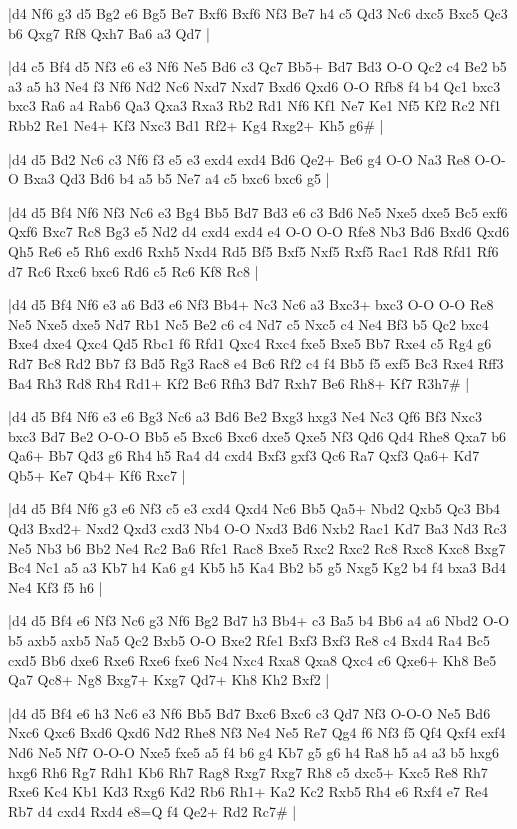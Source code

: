 \whitename{}
\blackname{}
\makegametitle
|d4 Nf6 g3 d5 Bg2 e6 Bg5 Be7 Bxf6 Bxf6 Nf3 Be7 h4 c5 Qd3 Nc6 dxc5 Bxc5 Qc3 b6 Qxg7 Rf8 Qxh7 Ba6 a3 Qd7  |

\whitename{}
\blackname{}
\makegametitle
|d4 c5 Bf4 d5 Nf3 e6 e3 Nf6 Ne5 Bd6 c3 Qc7 Bb5+ Bd7 Bd3 O-O Qc2 c4 Be2 b5 a3 a5 h3 Ne4 f3 Nf6 Nd2 Nc6 Nxd7 Nxd7 Bxd6 Qxd6 O-O Rfb8 f4 b4 Qc1 bxc3 bxc3 Ra6 a4 Rab6 Qa3 Qxa3 Rxa3 Rb2 Rd1 Nf6 Kf1 Ne7 Ke1 Nf5 Kf2 Rc2 Nf1 Rbb2 Re1 Ne4+ Kf3 Nxc3 Bd1 Rf2+ Kg4 Rxg2+ Kh5 g6\#  |

\whitename{}
\blackname{}
\makegametitle
|d4 d5 Bd2 Nc6 c3 Nf6 f3 e5 e3 exd4 exd4 Bd6 Qe2+ Be6 g4 O-O Na3 Re8 O-O-O Bxa3 Qd3 Bd6 b4 a5 b5 Ne7 a4 c5 bxc6 bxc6 g5  |

\whitename{}
\blackname{}
\makegametitle
|d4 d5 Bf4 Nf6 Nf3 Nc6 e3 Bg4 Bb5 Bd7 Bd3 e6 c3 Bd6 Ne5 Nxe5 dxe5 Bc5 exf6 Qxf6 Bxc7 Rc8 Bg3 e5 Nd2 d4 cxd4 exd4 e4 O-O O-O Rfe8 Nb3 Bd6 Bxd6 Qxd6 Qh5 Re6 e5 Rh6 exd6 Rxh5 Nxd4 Rd5 Bf5 Bxf5 Nxf5 Rxf5 Rac1 Rd8 Rfd1 Rf6 d7 Rc6 Rxc6 bxc6 Rd6 c5 Rc6 Kf8 Rc8  |

\whitename{}
\blackname{}
\makegametitle
|d4 d5 Bf4 Nf6 e3 a6 Bd3 e6 Nf3 Bb4+ Nc3 Nc6 a3 Bxc3+ bxc3 O-O O-O Re8 Ne5 Nxe5 dxe5 Nd7 Rb1 Nc5 Be2 c6 c4 Nd7 c5 Nxc5 c4 Ne4 Bf3 b5 Qc2 bxc4 Bxe4 dxe4 Qxc4 Qd5 Rbc1 f6 Rfd1 Qxc4 Rxc4 fxe5 Bxe5 Bb7 Rxe4 c5 Rg4 g6 Rd7 Bc8 Rd2 Bb7 f3 Bd5 Rg3 Rac8 e4 Bc6 Rf2 c4 f4 Bb5 f5 exf5 Bc3 Rxe4 Rff3 Ba4 Rh3 Rd8 Rh4 Rd1+ Kf2 Bc6 Rfh3 Bd7 Rxh7 Be6 Rh8+ Kf7 R3h7\#  |

\whitename{}
\blackname{}
\makegametitle
|d4 d5 Bf4 Nf6 e3 e6 Bg3 Nc6 a3 Bd6 Be2 Bxg3 hxg3 Ne4 Nc3 Qf6 Bf3 Nxc3 bxc3 Bd7 Be2 O-O-O Bb5 e5 Bxc6 Bxc6 dxe5 Qxe5 Nf3 Qd6 Qd4 Rhe8 Qxa7 b6 Qa6+ Bb7 Qd3 g6 Rh4 h5 Ra4 d4 cxd4 Bxf3 gxf3 Qc6 Ra7 Qxf3 Qa6+ Kd7 Qb5+ Ke7 Qb4+ Kf6 Rxc7  |

\whitename{}
\blackname{}
\makegametitle
|d4 d5 Bf4 Nf6 g3 e6 Nf3 c5 e3 cxd4 Qxd4 Nc6 Bb5 Qa5+ Nbd2 Qxb5 Qc3 Bb4 Qd3 Bxd2+ Nxd2 Qxd3 cxd3 Nb4 O-O Nxd3 Bd6 Nxb2 Rac1 Kd7 Ba3 Nd3 Rc3 Ne5 Nb3 b6 Bb2 Ne4 Rc2 Ba6 Rfc1 Rac8 Bxe5 Rxc2 Rxc2 Rc8 Rxc8 Kxc8 Bxg7 Bc4 Nc1 a5 a3 Kb7 h4 Ka6 g4 Kb5 h5 Ka4 Bb2 b5 g5 Nxg5 Kg2 b4 f4 bxa3 Bd4 Ne4 Kf3 f5 h6  |

\whitename{}
\blackname{}
\makegametitle
|d4 d5 Bf4 e6 Nf3 Nc6 g3 Nf6 Bg2 Bd7 h3 Bb4+ c3 Ba5 b4 Bb6 a4 a6 Nbd2 O-O b5 axb5 axb5 Na5 Qc2 Bxb5 O-O Bxe2 Rfe1 Bxf3 Bxf3 Re8 c4 Bxd4 Ra4 Bc5 cxd5 Bb6 dxe6 Rxe6 Rxe6 fxe6 Nc4 Nxc4 Rxa8 Qxa8 Qxc4 c6 Qxe6+ Kh8 Be5 Qa7 Qc8+ Ng8 Bxg7+ Kxg7 Qd7+ Kh8 Kh2 Bxf2  |

\whitename{}
\blackname{}
\makegametitle
|d4 d5 Bf4 e6 h3 Nc6 e3 Nf6 Bb5 Bd7 Bxc6 Bxc6 c3 Qd7 Nf3 O-O-O Ne5 Bd6 Nxc6 Qxc6 Bxd6 Qxd6 Nd2 Rhe8 Nf3 Ne4 Ne5 Re7 Qg4 f6 Nf3 f5 Qf4 Qxf4 exf4 Nd6 Ne5 Nf7 O-O-O Nxe5 fxe5 a5 f4 b6 g4 Kb7 g5 g6 h4 Ra8 h5 a4 a3 b5 hxg6 hxg6 Rh6 Rg7 Rdh1 Kb6 Rh7 Rag8 Rxg7 Rxg7 Rh8 c5 dxc5+ Kxc5 Re8 Rh7 Rxe6 Kc4 Kb1 Kd3 Rxg6 Kd2 Rb6 Rh1+ Ka2 Kc2 Rxb5 Rh4 e6 Rxf4 e7 Re4 Rb7 d4 cxd4 Rxd4 e8=Q f4 Qe2+ Rd2 Rc7\#  |

